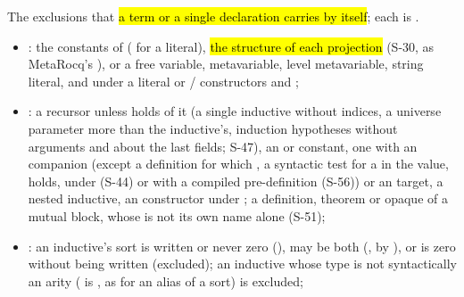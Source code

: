 \begin{definition}
  \label{def:Erasure-declExclusion}
  \leanok
   The exclusions that \hl{a term or a single declaration carries by itself}; each
  is .
  \begin{itemize}
  \item {}: the constants of  ( for a literal), \hl{the
        structure of each projection} (S-30, as MetaRocq's ), or a free
        variable, metavariable, level metavariable, string literal, and under
         a  literal or / constructors and
        ;
  \item {}: a recursor unless  holds of it (a single
        inductive without indices, a universe parameter more than the inductive's, induction
        hypotheses without arguments and about the last fields; S-47), an  or
         constant, one with an  companion (except a
        definition for which , a syntactic test for a
         in the value, holds, under
         (S-44) or with a compiled pre-definition 
        (S-56)) or an  target, a nested inductive, an  constructor under ;
        a definition, theorem or opaque of a mutual block, whose  is not its own name
        alone (S-51);
  \item {}: an inductive's sort is written  or never zero
        (), may be both (, by ), or is zero without
        being written  (excluded); an inductive whose type is not syntactically
        an arity ( is , as for an alias of a sort) is excluded;
  \end{itemize}
\end{definition}

